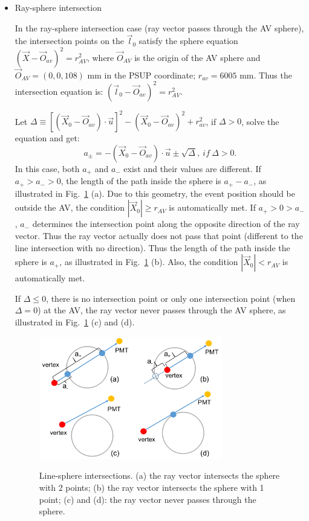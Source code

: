 \begin{itemize}
\item Ray-sphere intersection

In the ray-sphere intersection case (ray vector passes through the AV sphere), the intersection points on the $\vec{l}_0$ satisfy the sphere equation $(\vec{X}-\vec{O}_{av})^2= r^2_{AV}$, where $\vec{O}_{AV}$ is the origin of the AV sphere and $\vec{O}_{AV} = (0,0,108)$ mm in the PSUP coordinate; $r_{av}=6005$ mm. Thus the intersection equation is:
$(\vec{l}_0-\vec{O}_{av})^2 = r^2_{AV}$.

Let $\Delta \equiv {[(\vec{X}_0-\vec{O}_{av})\cdot\vec{u}]}^2-{(\vec{X}_0-\vec{O}_{av})}^2+r^2_{av}$, if $\Delta>0$, solve the equation and get:
\begin{equation}\label{eq:ray-sphere}
a_{\pm} = -(\vec{X}_0-\vec{O}_{av})\cdot\vec{u}\pm\sqrt{\Delta},~if~\Delta>0.
\end{equation}
In this case, both $a_+$ and $a_-$ exist and their values are different. If $a_+>a_->0$, the length of the path inside the sphere is $a_+-a_-$, as illustrated in Fig.~\ref{line-sphere} (a). Due to this geometry, the event position should be outside the AV, the condition $|\vec{X}_0|\geq r_{AV}$ is automatically met. If $a_+>0>a_-$, $a_-$ determines the intersection point along the opposite direction of the ray vector. Thus the ray vector actually does not pass that point (different to the line intersection with no direction). Thus the length of the path inside the sphere is $a_+$, as illustrated in Fig.~\ref{line-sphere} (b). Also, the condition $|\vec{X}_0|<r_{AV}$ is automatically met. 

If $\Delta\leq0$,
there is no intersection point or only one intersection point (when $\Delta=0$) at the AV, the ray vector never passes through the AV sphere, as illustrated in Fig.~\ref{line-sphere} (c) and (d).

\begin{figure}
	\centering
{\includegraphics[width=80mm]{line-sphere.png}}
\caption{Line-sphere intersections. (a) the ray vector intersects the sphere with 2 points; (b) the ray vector intersects the sphere with 1 point; (c) and (d): the ray vector never passes through the sphere.}\label{line-sphere}
\end{figure}


\end{itemize}
